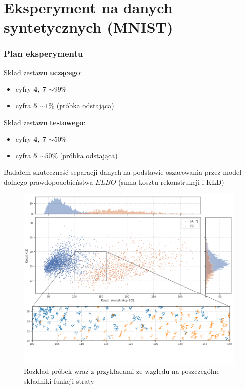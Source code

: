 \documentclass[polish, 13pt]{beamer}
\begin{document}
\section{Eksperyment na danych syntetycznych (MNIST)}

\begin{frame}
 \frametitle{Plan eksperymentu}
 Skład zestawu \textbf{uczącego}:
 \begin{itemize}
  \item cyfry \textbf{4, 7} $\sim 99\%$
  \item cyfra \textbf{5} $\sim 1\%$ (próbka odstająca)
 \end{itemize}
 
 \vspace{5mm}
 
 Skład zestawu \textbf{testowego}:
 \begin{itemize}
  \item cyfry \textbf{4, 7} $\sim 50\%$
  \item cyfra \textbf{5} $\sim 50\%$ (próbka odstająca)
 \end{itemize}
 
 \vspace{5mm}
 
 Badałem skuteczność separacji danych na podstawie oszacowania przez model dolnego prawdopodobieństwa $ELBO$ (suma kosztu rekonstrukcji i KLD)
\end{frame}


\begin{frame}
 \begin{figure}
  \includegraphics[scale=0.3]{images/mnist_complex}
  \caption{Rozkład próbek wraz z przykładami ze względu na poszczególne składniki funkcji straty}
 \end{figure}
\end{frame}
\end{document}
